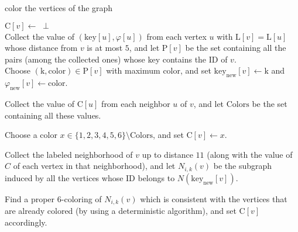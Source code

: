 \documentclass{article}
\theoremstyle{definition}
\begin{document}
\begin{algorithm}[H]\label{Alg6ColorGraph}\small
	\caption{color the vertices of the graph}
\SetInd{1em}{0em}
$\text{C}[v] \gets \;\perp$\\
Collect the value of $(\text{key}[u], \varphi[u])$ from each vertex $u$ with $\text{L}[v] = \text{L}[u]$ whose distance from $v$ is at most $5$, and let $\text{P}[v]$ be the set containing all the pairs (among the collected ones) whose key contains the ID of $v$.\\ \label{line:collectCycle6}
Choose $(\text{k},\text{color}) \in \text{P}[v]$ with maximum color, and set $\text{key}_{\text{new}}[v] \gets \text{k}$ and $\varphi_{\text{new}}[v] \gets \text{color}$.\label{line:chooseCycle6}

	 { \label{line:outer6}

		     { \label{line:innerStep1_6}
		Collect the value of $\text{C}[u]$ from each neighbor $u$ of $v$, and let $\text{Colors}$ be the set containing all these values.


               { \label{line:innerCond1_6}
		Choose a color $x \in \{1,2,3,4,5,6\} \setminus \text{Colors}$, and set $\text{C}[v] \gets x$.\label{line:ColorVertex6}
      }}

                   \smallskip{}
		     { \label{alg2:inner6}
		Collect the labeled neighborhood of $v$ up to distance $11$ (along with the value of $C$ of each vertex in that neighborhood), and let $N_{i,k}(v)$ be the subgraph induced by all the vertices whose ID belongs to $N(\text{key}_{\text{new}}[v])$.

               {\label{line:innerCond2_6}
Find a proper $6$-coloring of $N_{i,k}(v)$ which is consistent with the vertices that are already colored (by using a deterministic algorithm), and set $\text{C}[v]$ accordingly.  \label{line:ColorRemovable_6}

}}}

\end{algorithm}

\medskip \smallskip
\end{document}
